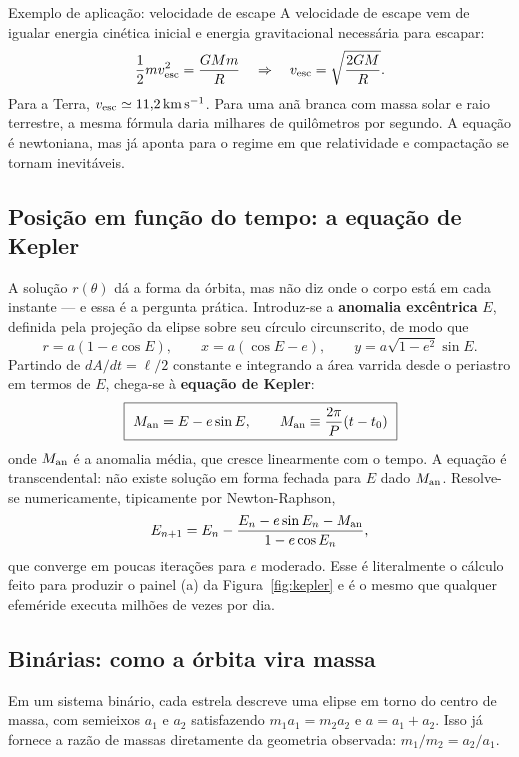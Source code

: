 \documentclass[11pt,a4paper]{article}
\begin{document}
\begin{lessonblock}{Exemplo de aplicação: velocidade de escape}
A velocidade de escape vem de igualar energia cinética inicial e energia gravitacional necessária para escapar:
\[
\frac{1}{2}mv_{\rm esc}^2=\frac{GMm}{R}
\quad\Rightarrow\quad
v_{\rm esc}=\sqrt{\frac{2GM}{R}}.
\]
Para a Terra, $v_{\rm esc}\simeq11{,}2\,\mathrm{km\,s^{-1}}$. Para uma anã branca com massa solar e raio terrestre, a mesma fórmula daria milhares de quilômetros por segundo. A equação é newtoniana, mas já aponta para o regime em que relatividade e compactação se tornam inevitáveis.
\end{lessonblock}

\subsection*{Posição em função do tempo: a equação de Kepler}

A solução $r(\theta)$ dá a forma da órbita, mas não diz onde o corpo está em cada instante --- e essa é a pergunta prática. Introduz-se a \textbf{anomalia excêntrica} $E$, definida pela projeção da elipse sobre seu círculo circunscrito, de modo que
\[
r=a(1-e\cos E),\qquad
x=a(\cos E-e),\qquad
y=a\sqrt{1-e^{2}}\sin E.
\]
Partindo de $dA/dt=\ell/2$ constante e integrando a área varrida desde o periastro em termos de $E$, chega-se à \textbf{equação de Kepler}:
\[
\boxed{\ M_{\rm an}=E-e\sin E,\qquad M_{\rm an}\equiv\frac{2\pi}{P}(t-t_0)\ }
\]
onde $M_{\rm an}$ é a anomalia média, que cresce linearmente com o tempo. A equação é transcendental: não existe solução em forma fechada para $E$ dado $M_{\rm an}$. Resolve-se numericamente, tipicamente por Newton-Raphson,
\[
E_{n+1}=E_{n}-\frac{E_{n}-e\sin E_{n}-M_{\rm an}}{1-e\cos E_{n}},
\]
que converge em poucas iterações para $e$ moderado. Esse é literalmente o cálculo feito para produzir o painel (a) da Figura~\ref{fig:kepler} e é o mesmo que qualquer efeméride executa milhões de vezes por dia.

\subsection*{Binárias: como a órbita vira massa}

Em um sistema binário, cada estrela descreve uma elipse em torno do centro de massa, com semieixos $a_1$ e $a_2$ satisfazendo $m_1a_1=m_2a_2$ e $a=a_1+a_2$. Isso já fornece a razão de massas diretamente da geometria observada: $m_1/m_2=a_2/a_1$.
\end{document}
